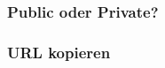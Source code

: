 \documentclass[12pt,ngerman]{beamer}
\begin{document}
\begin{frame}
\frametitle{Public oder Private?}

\begin{center}
\end{center}

\end{frame}

\begin{frame}
\frametitle{URL kopieren}

\begin{center}
\end{center}

\end{frame}
\end{document}
